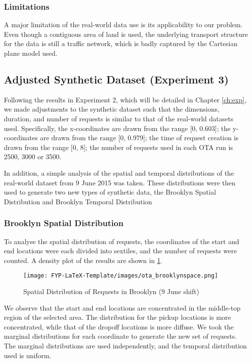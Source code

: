 \documentclass[urop]{socreport}
\begin{document}
\subsubsection{Limitations}
A major limitation of the real-world data use is its applicability to our problem. Even though a contiguous area of land is used, the underlying transport structure for the data is still a traffic network, which is badly captured by the Cartesian plane model used.

\subsection{Adjusted Synthetic Dataset (Experiment 3)}
\label{sec:exp3data}
Following the results in Experiment 2, which will be detailed in Chapter \ref{ch:exp}, we made adjustments to the synthetic dataset such that the dimensions, duration, and number of requests is similar to that of the real-world datasets used. Specifically, the x-coordinates are drawn from the range [0, 0.603]; the y-coordinates are drawn from the range [0, 0.979]; the time of request creation is drawn from the range [0, 8]; the number of requests used in each OTA run is 2500, 3000 or 3500.

In addition, a simple analysis of the spatial and temporal distributions of the real-world dataset from 9 June 2015 was taken. These distributions were then used to generate two new types of synthetic data, the Brooklyn Spatial Distribution and Brooklyn Temporal Distribution

\subsubsection{Brooklyn Spatial Distribution}
To analyse the spatial distribution of requests, the coordinates of the start and end locations were each divided into sextiles, and the number of requests were counted. A density plot of the results are shown in \ref{fig:brooklyn_space}. 

\begin{figure}[h]
    \centering
    \texttt{[image: FYP-LaTeX-Template/images/ota\_brooklynspace.png]}
    \caption{Spatial Distribution of Requests in Brooklyn (9 June shift)}
    \label{fig:brooklyn_space}
\end{figure}

We observe that the start and end locations are concentrated in the middle-top region of the selected area. The distribution for the pickup locations is more concentrated, while that of the dropoff locations is more diffuse. We took the marginal distributions for each coordinate to generate the new set of requests. The marginal distributions are used independently, and the temporal distribution used is uniform.
\end{document}
